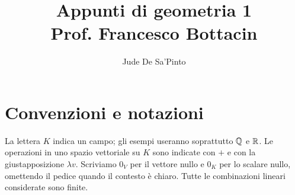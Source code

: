 \documentclass[11pt,a4paper,oneside]{report}
\title{Appunti di geometria 1\\[.8em]\large Prof. Francesco Bottacin}
\author{Jude De Sa'Pinto}
\date{}
\begin{document}
\hypersetup{pageanchor=false}
\maketitle
\hypersetup{pageanchor=true}
\begingroup
\small
\tableofcontents
\endgroup
\clearpage

\chapter*{Convenzioni e notazioni}
La lettera $K$ indica un campo; gli esempi useranno soprattutto $\mathbb{Q}$ e $\mathbb{R}$. Le operazioni in uno spazio vettoriale su $K$ sono indicate con $+$ e con la giustapposizione $\lambda v$. Scriviamo $0_V$ per il vettore nullo e $0_K$ per lo scalare nullo, omettendo il pedice quando il contesto è chiaro. Tutte le combinazioni lineari considerate sono finite.

\clearpage
{}




\end{document}
